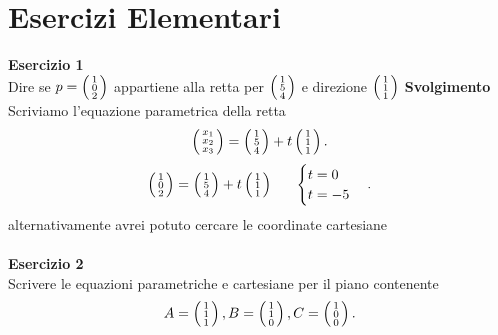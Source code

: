 \documentclass[12px]{article}
\begin{document}
	\section{Esercizi Elementari}
	\textbf{Esercizio 1} \\
	Dire se $p = \icol{1\\0\\2}$ appartiene alla retta per $\icol{1\\5\\4}$
	e direzione $\icol{1\\1\\1}$
	\textbf{Svolgimento}
	Scriviamo l'equazione parametrica della retta
	\[
		\icol{x_1\\x_2\\x_3} = \icol{1\\5\\4} + t\icol{1\\1\\1}
	.\]
	\[
		\icol{1\\0\\2} = \icol{1\\5\\4} + t\icol{1\\1\\1} \ \ \ \ \ \begin{cases}
			t = 0\\
			t = -5
		\end{cases}
	.\] 
	alternativamente avrei potuto cercare le coordinate cartesiane\\
	\hline \ \\
	\textbf{Esercizio 2} \\
	Scrivere le equazioni parametriche e cartesiane per il piano contenente 
	\[
		A = \icol{1\\1\\1}, B = \icol{1\\1\\0},C = \icol{1\\0\\0}
	.\]
\end{document}
